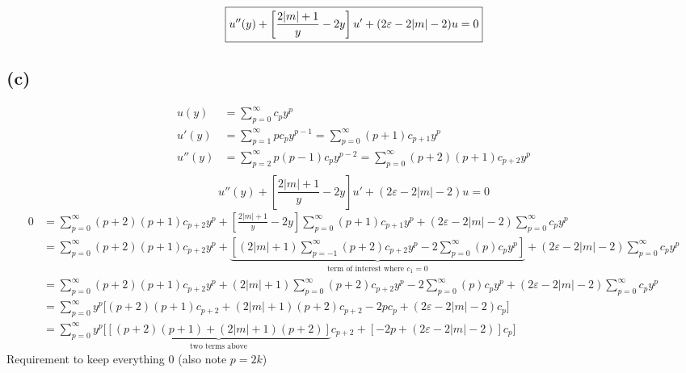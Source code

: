 \documentclass[letter, 10pts]{article}
\begin{document}
\[
\boxed{
u''(y)+
\left[
\frac{2|m| + 1}{y} - 2y 	
\right] u'
+ 
(2 \varepsilon - 2|m| - 2) u = 0\\ 
}
\] 


\subsection*{(c)} 
\begin{align*}
u(y) &= \sum_{p = 0}^{\infty} c_p y^{p} \\
u'(y) &= \sum_{p = 1}^{\infty}  p c_p y^{ p - 1}
      = \sum_{p = 0 }^{\infty} (p+1) c_{p+1} y^{p} \\
u''(y) &= \sum_{p = 2}^{\infty}  p(p-1) c_p y^{ p - 2}  
= \sum_{p = 0}^{\infty}  (p+2)(p+1) c_{p+2} y^{ p}  \\ &
\end{align*}
\[
u''(y)+
\left[
\frac{2|m| + 1}{y} - 2y 	
\right] u'
+ 
(2 \varepsilon - 2|m| - 2) u = 0 \] 
\begin{align*}
0 &= 
\sum_{p = 0}^{\infty}  (p+2)(p+1) c_{p+2} y^{ p}  +
\left[
\frac{2|m| + 1}{y} - 2y 	
\right] 
      \sum_{p = 0 }^{\infty} (p+1) c_{p+1} y^{p} 
      + 
(2 \varepsilon - 2|m| - 2) 
\sum_{p = 0}^{\infty} c_p y^{p} 
\\
&= 
\sum_{p = 0}^{\infty}  (p+2)(p+1) c_{p+2} y^{ p}  +
\underbrace{\left[
	({2|m| + 1})
      \sum_{p = -1 }^{\infty} (p+2) c_{p+2} y^{p} 
	- 2  	
      \sum_{p = 0 }^{\infty} (p) c_{p} y^{p} 
\right]}_{\text{term of interest where $c_1 = 0$}}
      + 
(2 \varepsilon - 2|m| - 2) 
\sum_{p = 0}^{\infty} c_p y^{p} 
\\
&= 
\sum_{p = 0}^{\infty}  (p+2)(p+1) c_{p+2} y^{ p}  +
	({2|m| + 1})
      \sum_{p = 0 }^{\infty} (p+2) c_{p+2} y^{p} 
	- 2  	
      \sum_{p = 0 }^{\infty} (p) c_{p} y^{p} 
      + 
(2 \varepsilon - 2|m| - 2) 
\sum_{p = 0}^{\infty} c_p y^{p} 
\\ &=
\sum_{p = 0}^{\infty} y^{p} 
\Biggr[
(p+2)(p+1) c_{p+2} + (2|m|+1) (p+2)c_{p+2} - 2 p c_p + (2 \varepsilon - 2 |m| - 2) c_p
\Biggr]
\\ &=
\sum_{p = 0}^{\infty} y^{p} 
\Biggr[
\underbrace{\left[(p+2)(p+1)  + (2|m|+1) (p+2)\right] 
}_{\text{two terms above}}c_{p+2}
+
\left[ 
- 2 p  + (2 \varepsilon - 2 |m| - 2) \right]
c_p
\Biggr]
\end{align*}
Requirement to keep everything $0$ (also note $p = 2k$) 
\end{document}
